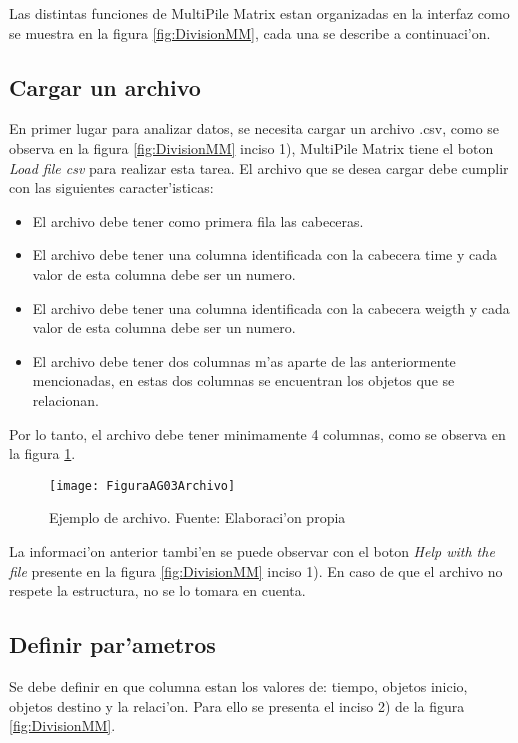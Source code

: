 Las distintas funciones de MultiPile Matrix estan organizadas en la interfaz como se muestra en la figura \ref{fig:DivisionMM}, cada una se describe a continuaci'on. 


\subsection{Cargar un archivo}
En primer lugar para analizar datos, se necesita cargar un archivo .csv, como se observa en la figura \ref{fig:DivisionMM} inciso 1), MultiPile Matrix tiene el boton \emph{Load file csv} para realizar esta tarea. El archivo que se desea cargar debe cumplir con las siguientes caracter'isticas:

\begin{itemize}
\item El archivo debe tener como primera fila las cabeceras.
\item El archivo debe tener una columna identificada con la cabecera time y cada valor de esta columna debe ser un numero.
\item El archivo debe tener una columna identificada con la cabecera weigth y cada valor de esta columna debe ser un numero.
\item El archivo debe tener dos columnas m'as aparte de las anteriormente mencionadas, en estas dos columnas se encuentran los objetos que se relacionan.
\end{itemize}

Por lo tanto, el archivo debe tener minimamente 4 columnas, como se observa en la figura \ref{fig:Archivo1}.

\begin{figure}[h]
    \centering
    \texttt{[image: FiguraAG03Archivo]}
    \caption{Ejemplo de archivo. Fuente: Elaboraci'on propia}
    \label{fig:Archivo1}
\end{figure}

La informaci'on anterior tambi'en se puede observar con el boton \emph{Help with the file} presente en la figura \ref{fig:DivisionMM} inciso 1).
En caso de que el archivo no respete la estructura, no se lo tomara en cuenta.

\subsection{Definir par'ametros}
Se debe definir en que columna estan los valores de: tiempo, objetos inicio, objetos destino y la relaci'on. Para ello se presenta el inciso 2) de la figura \ref{fig:DivisionMM}.

